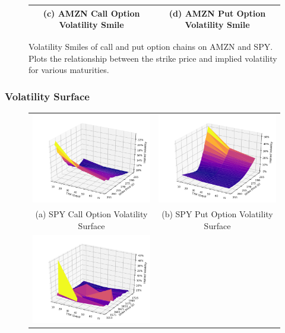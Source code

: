 \documentclass[10pt]{article}
\begin{document}
\begin{figure}
\begin{tabular}{|c|c|}
                (c) AMZN Call Option Volatility Smile &
                (d) AMZN Put Option Volatility Smile \\
                \hline
            \end{tabular}
            \label{fig:volatility_smiles}
            \caption{Volatility Smiles of call and put option chains on AMZN and SPY. Plots the relationship between the strike price and implied volatility for various maturities.}
        \end{figure}

        \subsubsection{Volatility Surface}

        \begin{figure}
            \begin{tabular}{|c|c|}
                \hline
                \includegraphics[width=.47\textwidth]{bin/vol_surface/SPY_Call_3DVolSurface.png} &
                \includegraphics[width=.47\textwidth]{bin/vol_surface/SPY_Put_3DVolSurface.png} \\
                (a) SPY Call Option Volatility Surface &
                (b) SPY Put Option Volatility Surface \\
                \hline
                \includegraphics[width=.47\textwidth]{bin/vol_surface/AMZN_Call_3DVolSurface.png} &

\end{tabular}
\end{figure}
\end{document}
